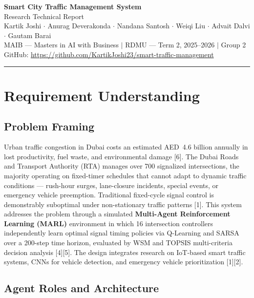\documentclass[11pt, a4paper]{article}
\begin{document}
\begin{center}
    {\LARGE \textbf{Smart City Traffic Management System}} \\[4pt]
    {\large Research Technical Report} \\[8pt]
    {\small Kartik Joshi $\cdot$ Anurag Deverakonda $\cdot$ Nandana Santosh $\cdot$ Weiqi Liu $\cdot$ Advait Dalvi $\cdot$ Gautam Barai} \\[3pt]
    {\small MAIB --- Masters in AI with Business $\mid$ RDMU --- Term 2, 2025--2026 $\mid$ Group 2} \\[3pt]
    {\small GitHub: \url{https://github.com/KartikJoshi23/smart-traffic-management}}
\end{center}

\vspace{6pt}
\hrule
\vspace{8pt}

\section{Requirement Understanding}

\subsection{Problem Framing}

Urban traffic congestion in Dubai costs an estimated AED~4.6 billion annually in lost productivity, fuel waste, and environmental damage [6]. The Dubai Roads and Transport Authority (RTA) manages over 700 signalized intersections, the majority operating on fixed-timer schedules that cannot adapt to dynamic traffic conditions --- rush-hour surges, lane-closure incidents, special events, or emergency vehicle preemption. Traditional fixed-cycle signal control is demonstrably suboptimal under non-stationary traffic patterns [1]. This system addresses the problem through a simulated \textbf{Multi-Agent Reinforcement Learning (MARL)} environment in which 16 intersection controllers independently learn optimal signal timing policies via Q-Learning and SARSA over a 200-step time horizon, evaluated by WSM and TOPSIS multi-criteria decision analysis [4][5]. The design integrates research on IoT-based smart traffic systems, CNNs for vehicle detection, and emergency vehicle prioritization [1][2].

\subsection{Agent Roles and Architecture}
\end{document}
